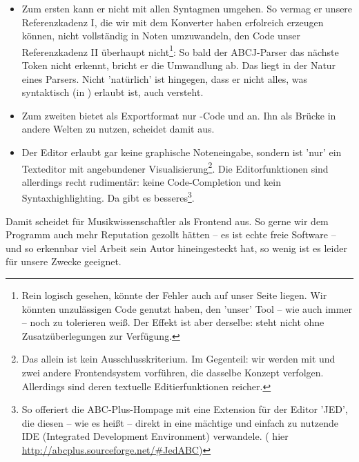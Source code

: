 \begin{itemize}
  \item Zum ersten kann er nicht mit allen Syntagmen umgehen. So vermag er
  unsere Referenzkadenz I, die wir mit dem Konverter  haben
  erfolreich erzeugen können, nicht vollständig in Noten umzuwandeln, den Code
  unser Referenzkadenz II überhaupt nicht\footnote{Rein logisch gesehen, könnte
  der Fehler auch auf unser Seite liegen. Wir könnten unzulässigen Code genutzt
  haben, den 'unser' Tool  -- wie auch immer -- noch zu tolerieren
  weiß. Der Effekt ist aber derselbe:  steht nicht ohne
  Zusatzüberlegungen zur Verfügung.}: So bald der ABCJ-Parser das nächste Token
  nicht erkennt, bricht er die Umwandlung ab. Das liegt in der Natur eines
  Parsers. Nicht 'natürlich' ist hingegen, dass er nicht alles, was syntaktisch
  (in ) erlaubt ist, auch versteht.
  \item Zum zweiten bietet  als Exportformat nur -Code und
   an. Ihn als Brücke in andere Welten zu nutzen, scheidet damit aus.
  \item Der Editor erlaubt gar keine graphische Noteneingabe, sondern ist 'nur'
  ein Texteditor mit angebundener Visualisierung\footnote{Das allein ist kein
  Ausschlusskriterium. Im Gegenteil: wir werden mit  und
   zwei andere Frontendsystem vorführen, die dasselbe Konzept
  verfolgen. Allerdings sind deren textuelle Editierfunktionen reicher.}. Die
  Editorfunktionen sind allerdings recht rudimentär: keine Code-Completion und
  kein Syntaxhighlighting. Da gibt es besseres\footnote{So offeriert die
  ABC-Plus-Hompage mit  eine Extension für der Editor 'JED', die
  diesen -- wie es heißt -- direkt in eine mächtige und einfach zu nutzende IDE
  (Integrated Development Environment) verwandele.
  (\cite[Vgl.][\nopage wp]{Gonzato2018a} hier
  \href{http://abcplus.sourceforge.net/\#JedABC}
  {http://abcplus.sourceforge.net/\#JedABC})}.
\end{itemize}

Damit scheidet  für Musikwissenschaftler als Frontend aus. So gerne
wir dem Programm auch mehr Reputation gezollt hätten -- es ist echte freie
Software -- und so erkennbar viel Arbeit sein Autor hineingesteckt hat, so wenig
ist es leider für unsere Zwecke geeignet.


%
